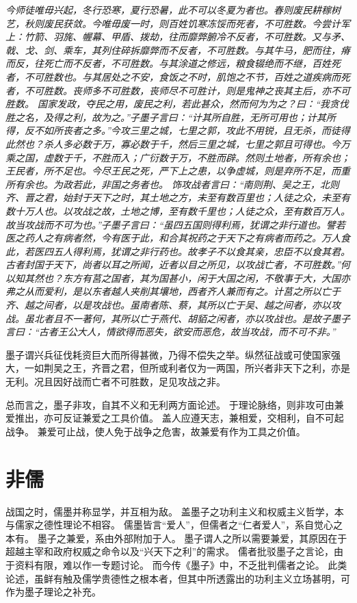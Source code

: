 \documentclass[11pt]{article}
\begin{document}
\textit{今师徒唯毋兴起，冬行恐寒，夏行恐暑，此不可以冬夏为者也。春则废民耕稼树艺，秋则废民获敛。今唯毋废一时，则百姓饥寒冻馁而死者，不可胜数。今尝计军上：竹箭、羽旄、幄幕、甲盾、拨劫，往而靡弊腑冷不反者，不可胜数。又与矛、戟、戈、剑、乘车，其列住碎拆靡弊而不反者，不可胜数。与其牛马，肥而往，瘠而反，往死亡而不反者，不可胜数。与其涂道之修远，粮食辍绝而不继，百姓死者，不可胜数也。与其居处之不安，食饭之不时，肌饱之不节，百姓之道疾病而死者，不可胜数。丧师多不可胜数，丧师尽不可胜计，则是鬼神之丧其主后，亦不可胜数。
\newline
国家发政，夺民之用，废民之利，若此甚众，然而何为为之？曰：“我贪伐胜之名，及得之利，故为之。”子墨子言曰：“计其所自胜，无所可用也；计其所得，反不如所丧者之多。”今攻三里之城，七里之郭，攻此不用锐，且无杀，而徒得此然也？杀人多必数于万，寡必数于千，然后三里之城，七里之郭且可得也。今万乘之国，虚数于千，不胜而入；广衍数于万，不胜而辟。然则土地者，所有余也；王民者，所不足也。今尽王民之死，严下上之患，以争虚城，则是弃所不足，而重所有余也。为政若此，非国之务者也。
\newline
饰攻战者言曰：“南则荆、吴之王，北则齐、晋之君，始封于天下之时，其土地之方，未至有数百里也；人徒之众，未至有数十万人也。以攻战之故，土地之博，至有数千里也；人徒之众，至有数百万人。故当攻战而不可为也。”子墨子言曰：“虽四五国则得利焉，犹谓之非行道也。譬若医之药人之有病者然，今有医于此，和合其祝药之于天下之有病者而药之。万人食此，若医四五人得利焉，犹谓之非行药也。故孝子不以食其亲，忠臣不以食其君。古者封国于天下，尚者以耳之所闻，近者以目之所见，以攻战亡者，不可胜数。”何以知其然也？东方有莒之国者，其为国甚小，闲于大国之闲，不敬事于大，大国亦弗之从而爱利，是以东者越人夹削其壤地，西者齐人兼而有之。计莒之所以亡于齐、越之间者，以是攻战也。虽南者陈、蔡，其所以亡于吴、越之间者，亦以攻战。虽北者且不一著何，其所以亡于燕代、胡貊之闲者，亦以攻战也。是故子墨子言曰：“古者王公大人，情欲得而恶失，欲安而恶危，故当攻战，而不可不非。”}

墨子谓兴兵征伐耗资巨大而所得甚微，乃得不偿失之举。纵然征战或可使国家强大，一如荆吴之王，齐晋之君，但所或利者仅为一两国，所兴者非天下之利，亦是无利。况且因好战而亡者不可胜数，足见攻战之非。

总而言之，墨子非攻，自其不义和无利两方面论述。
于理论脉络，则非攻可由兼爱推出，亦可反证兼爱之工具价值。
盖人应遵天志，兼相爱，交相利，自不可起战争。
兼爱可止战，使人免于战争之危害，故兼爱有作为工具之价值。

\section{非儒}
战国之时，儒墨并称显学，并互相为敌。
盖墨子之功利主义和权威主义哲学，本与儒家之德性理论不相容。
儒墨皆言“爱人”，但儒者之“仁者爱人”，系自觉心之本有。
墨子之兼爱，系由外部附加于人。
墨子谓人之所以需要兼爱，其原因在于超越主宰和政府权威之命令以及“兴天下之利”的需求。
儒者批驳墨子之言论，由于资料有限，难以作一专题讨论。
而今传《墨子》中，不乏批判儒者之论。
此类论述，虽鲜有触及儒学贵德性之根本者，但其中所透露出的功利主义立场甚明，可作为墨子理论之补充。
\end{document}
